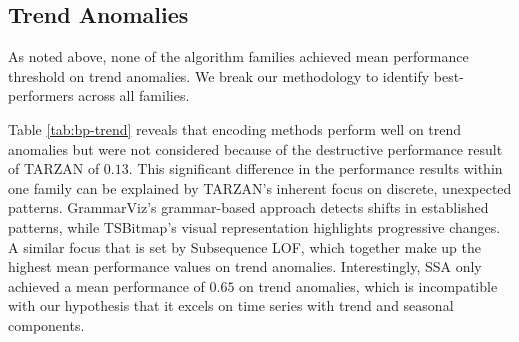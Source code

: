 \subsection{Trend Anomalies} 
    As noted above, none of the algorithm families achieved mean performance threshold on trend anomalies. We break our methodology to identify best-performers across all families.
    
    Table \ref{tab:bp-trend} reveals that encoding methods perform well on trend anomalies but were not considered because of the destructive performance result of TARZAN of $0.13$. This significant difference in the performance results within one family can be explained by TARZAN's inherent focus on discrete, unexpected patterns. GrammarViz’s grammar-based approach detects shifts in established patterns, while TSBitmap’s visual representation highlights progressive changes. A similar focus that is set by Subsequence LOF, which together make up the highest mean performance values on trend anomalies. 
    Interestingly, SSA only achieved a mean performance of $0.65$ on trend anomalies, which is incompatible with our hypothesis that it excels on time series with trend and seasonal components. 



